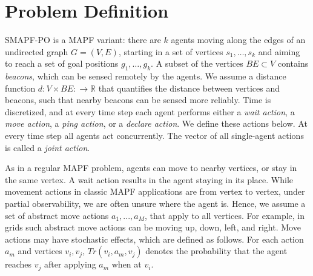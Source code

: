 \documentclass[letterpaper]{article} %
\begin{document}






\section{Problem Definition}

SMAPF-PO is a MAPF variant: there are $k$ agents moving along the edges of an undirected graph $G=(V,E)$, starting in a set of vertices $s_1,\ldots, s_k$ and
aiming to reach a set of goal positions $g_1,\ldots, g_k$.
A subset of the vertices $BE\subset V$ contains \emph{beacons}, which can be sensed remotely by the agents.
We assume a distance function $d:V\times BE:\rightarrow\mathbb{R}$ that quantifies the distance between vertices and beacons, such that nearby beacons can be sensed more reliably. Time is discretized, and at every time step each agent performs either a \emph{wait action}, a \emph{move action}, a \emph{ping action}, or a \emph{declare action}. We define these actions below.
At every time step all agents act concurrently. The vector of all single-agent actions is called a \emph{joint action}.

 As in a regular MAPF problem, agents can move to nearby vertices, or stay in the same vertex.
A wait action results in the agent staying in its place.
While movement actions in classic MAPF applications are from vertex to vertex, under partial observability, we are often unsure where the agent is. Hence, we assume a set of abstract move actions $a_1,...,a_M$, that apply to all vertices.
For example, in grids such abstract move actions can be moving up, down, left, and right.
Move actions may have stochastic effects, which are defined as follows.
For each action $a_m$ and vertices $v_i,v_j$, $Tr(v_i,a_m,v_j)$ denotes the probability that the agent reaches $v_j$ after applying $a_m$ when at $v_i$.

\end{document}
